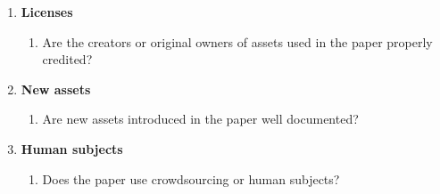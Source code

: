 \begin{enumerate}
\item \textbf{Licenses}
\begin{enumerate}
    \item Are the creators or original owners of assets used in the paper
    properly credited?
\end{enumerate}

\item \textbf{New assets}
\begin{enumerate}
    \item Are new assets introduced in the paper well documented?
\end{enumerate}

\item \textbf{Human subjects}
\begin{enumerate}
    \item Does the paper use crowdsourcing or human subjects?
    \answerNo{}
\end{enumerate}

\end{enumerate}

